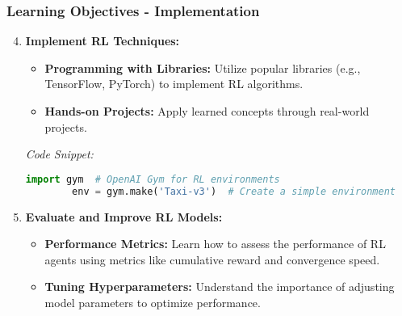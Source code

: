 \documentclass[aspectratio=169]{beamer}
\begin{document}
\begin{frame}[fragile]
    \frametitle{Learning Objectives - Implementation}
    \begin{enumerate}
        \setcounter{enumi}{3} %
        \item \textbf{Implement RL Techniques:}
        \begin{itemize}
            \item \textbf{Programming with Libraries:} Utilize popular libraries (e.g., TensorFlow, PyTorch) to implement RL algorithms.
            \item \textbf{Hands-on Projects:} Apply learned concepts through real-world projects.
        \end{itemize}
        
        \textit{Code Snippet:}
        \begin{lstlisting}[language=Python]
        import gym  # OpenAI Gym for RL environments
        env = gym.make('Taxi-v3')  # Create a simple environment
        \end{lstlisting}
        
        \item \textbf{Evaluate and Improve RL Models:}
        \begin{itemize}
            \item \textbf{Performance Metrics:} Learn how to assess the performance of RL agents using metrics like cumulative reward and convergence speed.
            \item \textbf{Tuning Hyperparameters:} Understand the importance of adjusting model parameters to optimize performance.
        \end{itemize}
    \end{enumerate}
\end{frame}
\end{document}
